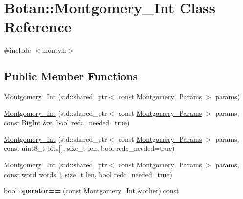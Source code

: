 \hypertarget{class_botan_1_1_montgomery___int}{}\section{Botan\+:\+:Montgomery\+\_\+\+Int Class Reference}
\label{class_botan_1_1_montgomery___int}


{\ttfamily \#include $<$monty.\+h$>$}

\subsection*{Public Member Functions}
\begin{DoxyCompactItemize}
\item 
\mbox{\hyperlink{class_botan_1_1_montgomery___int_a129cc27370aacbb8cc3f56c75239efce}{Montgomery\+\_\+\+Int}} (std\+::shared\+\_\+ptr$<$ const \mbox{\hyperlink{class_botan_1_1_montgomery___params}{Montgomery\+\_\+\+Params}} $>$ params)
\item 
\mbox{\hyperlink{class_botan_1_1_montgomery___int_acc0e9d1c3a33343a1f70f1850a12160f}{Montgomery\+\_\+\+Int}} (std\+::shared\+\_\+ptr$<$ const \mbox{\hyperlink{class_botan_1_1_montgomery___params}{Montgomery\+\_\+\+Params}} $>$ params, const Big\+Int \&v, bool redc\+\_\+needed=true)
\item 
\mbox{\hyperlink{class_botan_1_1_montgomery___int_a40f15c2012a27cc98c720de74200117d}{Montgomery\+\_\+\+Int}} (std\+::shared\+\_\+ptr$<$ const \mbox{\hyperlink{class_botan_1_1_montgomery___params}{Montgomery\+\_\+\+Params}} $>$ params, const uint8\+\_\+t bits\mbox{[}$\,$\mbox{]}, size\+\_\+t len, bool redc\+\_\+needed=true)
\item 
\mbox{\hyperlink{class_botan_1_1_montgomery___int_a5b3ce373167c2c897ffa6264327eec61}{Montgomery\+\_\+\+Int}} (std\+::shared\+\_\+ptr$<$ const \mbox{\hyperlink{class_botan_1_1_montgomery___params}{Montgomery\+\_\+\+Params}} $>$ params, const word words\mbox{[}$\,$\mbox{]}, size\+\_\+t len, bool redc\+\_\+needed=true)
\item 
\mbox{\label{class_botan_1_1_montgomery___int_a1a8d9c17a5a4a1155423f204fe9a39c2}} 
bool {\bfseries operator==} (const \mbox{\hyperlink{class_botan_1_1_montgomery___int}{Montgomery\+\_\+\+Int}} \&other) const
\item 
\mbox{\label{class_botan_1_1_montgomery___int_ab3274a085a383b8392c94b474d1a1b6b}} 

\end{DoxyCompactItemize}
